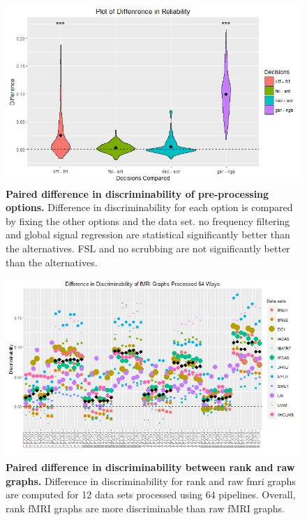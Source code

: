 \documentclass{article}
\begin{document}
\begin{figure}[ht!]
	\includegraphics[width=\linewidth]{../Figs/Differ_violin_mean.png}
	\caption{{ \bf Paired difference in discriminability of pre-processing options.} Difference in discriminability for each option is compared by fixing the other options and the data set. no frequency filtering and global signal regression are statistical significantly better than the alternatives. FSL and no scrubbing are not significantly better than the alternatives.}
	\label{fig:decs}
\end{figure}

\begin{figure}[ht!]
	\includegraphics[width=\linewidth]{../Figs/64_pipelines_differ.png}
	\caption{{ \bf Paired difference in discriminability between rank and raw graphs.} Difference in discriminability for rank and raw fmri graphs are computed for 12 data sets processed using 64 pipelines. Overall, rank fMRI graphs are more discriminable than raw fMRI graphs.}
	\label{fig:rank}
\end{figure}
\end{document}
